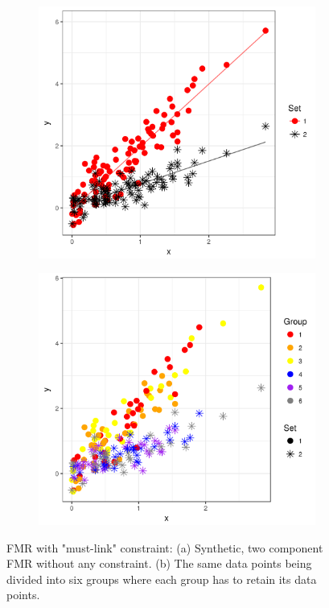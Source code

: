 \documentclass[12pt]{article}
\begin{document}
\begin{figure}[ht]
\begin{subfigure}{.5\textwidth}
\centering
\includegraphics[width=1\linewidth]{fmr.png}
\caption{\footnotesize{}}\label{fig:sfig1}
\end{subfigure}
\begin{subfigure}{.5\textwidth}
\centering
\includegraphics[width=1\linewidth, scale = 0.7]{fmr_const.png}

\caption{\footnotesize{}}\label{fig:sfig2}
\end{subfigure}
\caption{FMR with "must-link" constraint: (a) Synthetic, two component FMR without any constraint. (b) The same data points being divided into six groups where each group has to retain its data points.}\label{fig:fig1}
\end{figure}
\end{document}
